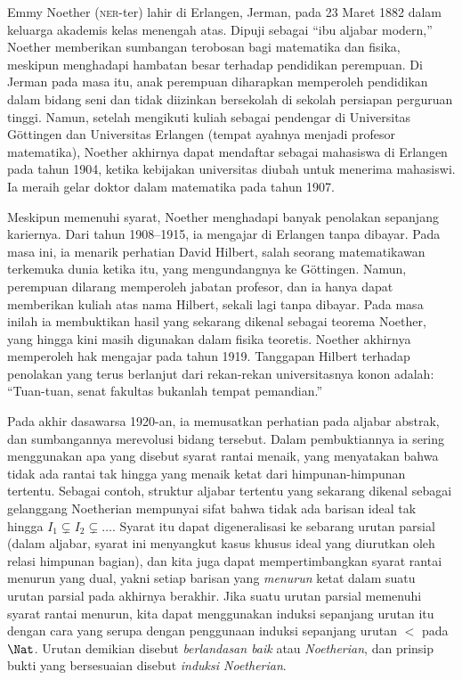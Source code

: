 \documentclass[../../../include/open-logic-section]{subfiles}
\begin{document}



Emmy Noether (\textsc{ner}-ter) lahir di Erlangen, Jerman, pada 23 Maret
1882 dalam keluarga akademis kelas menengah atas. Dipuji sebagai ``ibu
aljabar modern,'' Noether memberikan sumbangan terobosan bagi matematika
dan fisika, meskipun menghadapi hambatan besar terhadap pendidikan
perempuan. Di Jerman pada masa itu, anak perempuan diharapkan memperoleh
pendidikan dalam bidang seni dan tidak diizinkan bersekolah di sekolah
persiapan perguruan tinggi. Namun, setelah mengikuti kuliah sebagai
pendengar di Universitas G\"{o}ttingen dan Universitas Erlangen (tempat
ayahnya menjadi profesor matematika), Noether akhirnya dapat mendaftar
sebagai mahasiswa di Erlangen pada tahun 1904, ketika kebijakan universitas
diubah untuk menerima mahasiswi. Ia meraih gelar doktor dalam matematika
pada tahun 1907.

Meskipun memenuhi syarat, Noether menghadapi banyak penolakan sepanjang
kariernya. Dari tahun 1908--1915, ia mengajar di Erlangen tanpa dibayar.
Pada masa ini, ia menarik perhatian David Hilbert, salah seorang
matematikawan terkemuka dunia ketika itu, yang mengundangnya ke
G\"{o}ttingen. Namun, perempuan dilarang memperoleh jabatan profesor, dan ia
hanya dapat memberikan kuliah atas nama Hilbert, sekali lagi tanpa dibayar.
Pada masa inilah ia membuktikan hasil yang sekarang dikenal sebagai teorema
Noether, yang hingga kini masih digunakan dalam fisika teoretis. Noether
akhirnya memperoleh hak mengajar pada tahun 1919. Tanggapan Hilbert terhadap
penolakan yang terus berlanjut dari rekan-rekan universitasnya konon adalah:
``Tuan-tuan, senat fakultas bukanlah tempat pemandian.''

Pada akhir dasawarsa 1920-an, ia memusatkan perhatian pada aljabar abstrak,
dan sumbangannya merevolusi bidang tersebut. Dalam pembuktiannya ia sering
menggunakan apa yang disebut syarat rantai menaik, yang menyatakan bahwa
tidak ada rantai tak hingga yang menaik ketat dari himpunan-himpunan
tertentu. Sebagai contoh, struktur aljabar tertentu yang sekarang dikenal
sebagai gelanggang Noetherian mempunyai sifat bahwa tidak ada barisan ideal
tak hingga $I_1 \subsetneq I_2 \subsetneq \dots$. Syarat itu dapat
digeneralisasi ke sebarang urutan parsial (dalam aljabar, syarat ini
menyangkut kasus khusus ideal yang diurutkan oleh relasi himpunan bagian),
dan kita juga dapat mempertimbangkan syarat rantai menurun yang dual, yakni
setiap barisan yang \emph{menurun} ketat dalam suatu urutan parsial pada
akhirnya berakhir. Jika suatu urutan parsial memenuhi syarat rantai menurun,
kita dapat menggunakan induksi sepanjang urutan itu dengan cara yang serupa
dengan penggunaan induksi sepanjang urutan $<$ pada~$\Nat$. Urutan demikian
disebut \emph{berlandasan baik} atau \emph{Noetherian}, dan prinsip bukti
yang bersesuaian disebut \emph{induksi Noetherian}.
\end{document}
